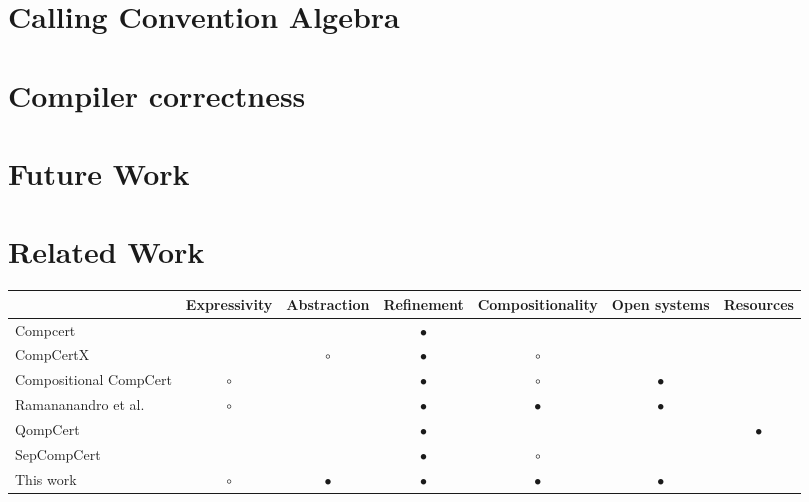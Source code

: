 \documentclass[sigplan,10pt,review,anonymous]{acmart}
\begin{document}
\section{Calling Convention Algebra} %


\section{Compiler correctness} %


\section{Future Work} %


\section{Related Work} %

\begin{table*}
  \begin{tabular}{lcccccc}
    \hline
    & Expressivity & Abstraction & Refinement & Compositionality & Open systems & Resources \\
    \hline
    Compcert \cite{compcert}
      &           &           & $\bullet$ &           &           & \\
    CompCertX \cite{popl2015}
      &           & $\circ$   & $\bullet$ & $\circ$   &           & \\
    Compositional CompCert \cite{compcompcert}
      & $\circ$   &           & $\bullet$ & $\circ$   & $\bullet$ & \\
    Ramananandro et al. \cite{cpp2015}
      & $\circ$   &           & $\bullet$ & $\bullet$ & $\bullet$ & \\
    QompCert \cite{qompcert}
      &           &           & $\bullet$ &           &           & $\bullet$ \\
    SepCompCert \cite{lwsc}
      &           &           & $\bullet$ & $\circ$   &           & \\
    This work
      & $\circ$   & $\bullet$ & $\bullet$ & $\bullet$ & $\bullet$ & \\
    \hline
  \end{tabular}
\end{table*}



\end{document}
